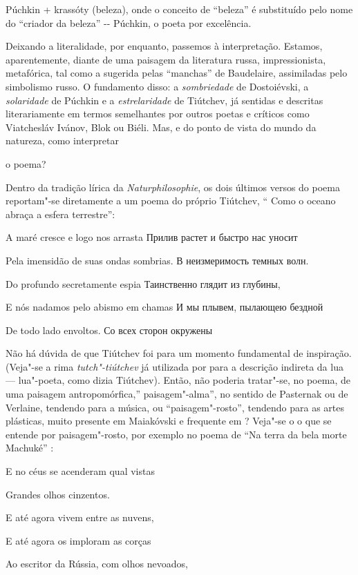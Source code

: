 Púchkin + krassóty (beleza), onde o conceito de ``beleza'' é substituído
pelo nome do ``criador da beleza'' -\/- Púchkin, o poeta por excelência.

Deixando a literalidade, por enquanto, passemos à interpretação.
Estamos, aparentemente, diante de uma paisagem da literatura russa,
impressionista, metafórica, tal como a sugerida pelas ``manchas'' de
Baudelaire, assimiladas pelo simbolismo russo. O fundamento disso: a
\emph{sombriedade} de Dostoiévski, a \emph{solaridade} de Púchkin e a
\emph{estrelaridade} de Tiútchev, já sentidas e descritas literariamente
em termos semelhantes por outros poetas e críticos como Viatchesláv
Ivánov, Blok ou Biéli. Mas, e do ponto de vista do mundo da natureza,
como interpretar

o poema?

Dentro da tradição lírica da \emph{Naturphilosophie}, os dois últimos
versos do poema reportam"-se diretamente a um poema do próprio Tiútchev,
`` Como o oceano abraça a esfera terrestre'':

A maré cresce e logo nos arrasta Прилив растет и быстро нас уносит

Pela imensidão de suas ondas sombrias. В неизмеримость темных волн.

Do profundo secretamente espia Таинственно глядит из глубины,

E nós nadamos pelo abismo em chamas И мы плывем, пылающею бездной

De todo lado envoltos. Со всех сторон окружены

Não há dúvida de que Tiútchev foi para  um momento fundamental de
inspiração. (Veja"-se a rima \emph{tutch"-tiútchev} já utilizada por
 para a descrição indireta da lua --- lua"-poeta, como dizia Tiútchev).
Então, não poderia tratar"-se, no poema, de uma paisagem
antropomórfica,'' paisagem"-alma'', no sentido de Pasternak ou de
Verlaine, tendendo para a música, ou ``paisagem"-rosto'', tendendo para
as artes plásticas, muito presente em Maiakóvski e frequente em ?
Veja"-se o o que se entende por paisagem"-rosto, por exemplo no poema de
 ``Na terra da bela morte Machuké'' :

E no céus se acenderam qual vistas

Grandes olhos cinzentos.

E até agora vivem entre as nuvens,

E até agora os imploram as corças

Ao escritor da Rússia, com olhos nevoados,

